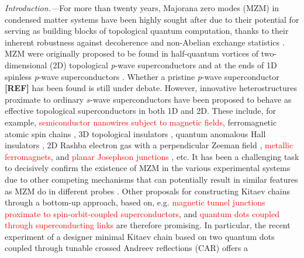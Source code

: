\documentclass[aps,prb,showpacs,amsmath,twocolumn,amssymb,superscriptaddress]{revtex4-2}
\newcommand{\Red}[1]{\textcolor{red}{#1}}
\begin{document}
\emph{Introduction.---}For more than twenty years, Majorana zero modes (MZM) in condensed matter systems have been highly sought after due to their potential for serving as building blocks of topological quantum computation, thanks to their inherent robustness against decoherence and non-Abelian exchange statistics \cite{ivanovNonAbelianStatisticsHalfQuantum2001, kitaevFaulttolerantQuantumComputation2003, nayakNonAbelianAnyonsTopological2008, aliceaNonAbelianStatisticsTopological2011, aasenMilestonesMajoranaBasedQuantum2016}. MZM were originally proposed to be found in half-quantum vortices of two-dimensional (2D) topological \textit{p}-wave superconductors and at the ends of 1D spinless \textit{p}-wave superconductors \cite{readPairedStatesFermions2000, kitaevUnpairedMajoranaFermions2001}. Whether a pristine \textit{p}-wave superconductor {\bf [REF]} has been found is still under debate. However, innovative heterostructures proximate to ordinary $s$-wave superconductors have been proposed to behave as effective topological superconductors in both 1D and 2D. These include, for example, \Red{semiconductor nanowires subject to magnetic fields}\cite{mourikSignaturesMajoranaFermions2012, rokhinsonFractionalJosephsonEffect2012, dengAnomalousZeroBiasConductance2012}, ferromagnetic atomic spin chains \cite{choyMajoranaFermionsEmerging2011, brauneckerInterplayClassicalMagnetic2013, klinovajaTopologicalSuperconductivityMajorana2013,nadj-pergeObservationMajoranaFermions2014,schneiderPrecursorsMajoranaModes2022}, 3D topological insulators \cite{fuSuperconductingProximityEffect2008, hosurMajoranaModesEnds2011, potterEngineeringMathitipSuperconductor2011, veldhorstMagnetotransportInducedSuperconductivity2013}, quantum anomalous Hall insulators \cite{chenQuasionedimensionalQuantumAnomalous2018, zengQuantumAnomalousHall2018, xieCreatingLocalizedMajorana2021}, 2D Rashba electron gas with a perpendicular Zeeman field \cite{oregHelicalLiquidsMajorana2010, sauGenericNewPlatform2010, lutchynSearchMajoranaFermions2011, potterTopologicalSuperconductivityMajorana2012, nadj-pergeProposalRealizingMajorana2013}, \Red{metallic ferromagnets}, and \Red{planar Josephson junctions} \cite{black-schafferMajoranaFermionsSpinorbitcoupled2011, pientkaSignaturesTopologicalPhase2013, hellTwoDimensionalPlatformNetworks2017, scharfTuningTopologicalSuperconductivity2019}, etc. It has been a challenging task to decisively confirm the existence of MZM in the various experimental systems due to other competing mechanisms that can potentially result in similar features as MZM do in different probes \cite{xuExperimentalDetectionMajorana2015, albrechtExponentialProtectionZero2016, sunMajoranaZeroMode2016, wangEvidenceMajoranaBound2018, jackObservationMajoranaZero2019, fornieriEvidenceTopologicalSuperconductivity2019, renTopologicalSuperconductivityPhasecontrolled2019, mannaSignaturePairMajorana2020}. Other proposals for constructing Kitaev chains through a bottom-up approach, based on, e.g. \Red{magnetic tunnel junctions proximate to spin-orbit-coupled superconductors}, and \Red{quantum dots coupled through superconducting links} are therefore promising. In particular, the recent experiment of a designer minimal Kitaev chain based on two quantum dots coupled through tunable crossed Andreev reflections (CAR) offers a 
\end{document}

